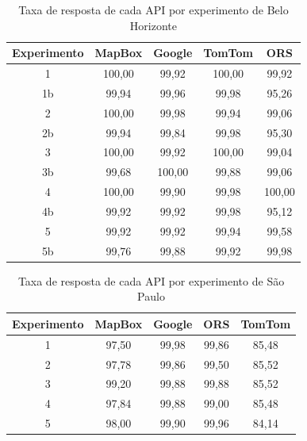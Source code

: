 \begin{table}[!ht]
    \centering
    \caption{Taxa de resposta de cada API por experimento de Belo Horizonte}
    \label{tab:txRespExpAPIBH}
    \begin{adjustbox}{width=0.7\textwidth}
    \begin{tabular}{|c|c|c|c|c|}
    \hline
    Experimento & MapBox & Google & TomTom & ORS\\
    \hline
    1 & 100,00 & 99,92 & 100,00 & 99,92\\
    \hline
    1b & 99,94 & 99,96 & 99,98 & 95,26 \\
    \hline
    2 & 100,00 & 99,98 & 99,94 & 99,06\\
    \hline
    2b & 99,94 & 99,84 & 99,98 & 95,30\\
    \hline
    3 & 100,00 & 99,92 & 100,00 & 99,04\\
    \hline
    3b & 99,68 & 100,00 & 99,88 & 99,06\\
    \hline
    4 & 100,00 & 99,90 & 99,98 & 100,00\\
    \hline
    4b & 99,92 & 99,92 & 99,98 & 95,12\\
    \hline
    5 & 99,92 & 99,92 & 99,94 & 99,58\\
    \hline
    5b & 99,76 & 99,88 & 99,92 & 99,98\\
    \hline
    \end{tabular}
    \end{adjustbox}
\end{table}

\begin{table}[!ht]
    \centering
    \caption{Taxa de resposta de cada API por experimento de São Paulo}
    \label{tab:txRespExpAPISP}
    \begin{adjustbox}{width=0.7\textwidth}
    \begin{tabular}{|c|c|c|c|c|}
    \hline
    Experimento & MapBox & Google & ORS & TomTom\\
    \hline
    1 & 97,50 & 99,98 & 99,86 & 85,48\\
    \hline
    2 & 97,78 & 99,86 & 99,50 & 85,52\\
    \hline
    3 & 99,20 & 99,88 & 99,88 & 85,52\\
    \hline
    4 & 97,84 & 99,88 & 99,00 & 85,48\\
    \hline
    5 & 98,00 & 99,90 & 99,96 & 84,14\\
    \hline
    \end{tabular}
    \end{adjustbox}
\end{table}

